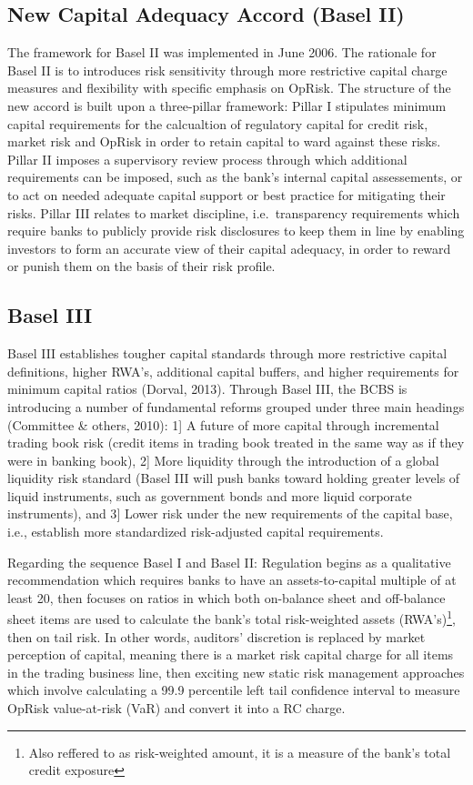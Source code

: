 \documentclass{DissertateUSU}
\begin{document}
\subsection{New Capital Adequacy Accord (Basel II)}

The framework for Basel II was implemented in June 2006. The rationale
for Basel II is to introduces risk sensitivity through more restrictive
capital charge measures and flexibility with specific emphasis on
OpRisk. The structure of the new accord is built upon a three-pillar
framework: Pillar I stipulates minimum capital requirements for the
calcualtion of regulatory capital for credit risk, market risk and
OpRisk in order to retain capital to ward against these risks. Pillar II
imposes a supervisory review process through which additional
requirements can be imposed, such as the bank's internal capital
assessements, or to act on needed adequate capital support or best
practice for mitigating their risks. Pillar III relates to market
discipline, i.e.~transparency requirements which require banks to
publicly provide risk disclosures to keep them in line by enabling
investors to form an accurate view of their capital adequacy, in order
to reward or punish them on the basis of their risk profile.\medskip

\subsection{Basel III}

Basel III establishes tougher capital standards through more restrictive
capital definitions, higher RWA's, additional capital buffers, and
higher requirements for minimum capital ratios (Dorval, 2013). Through
Basel III, the BCBS is introducing a number of fundamental reforms
grouped under three main headings (Committee \& others, 2010): 1{]} A
future of more capital through incremental trading book risk (credit
items in trading book treated in the same way as if they were in banking
book), 2{]} More liquidity through the introduction of a global
liquidity risk standard (Basel III will push banks toward holding
greater levels of liquid instruments, such as government bonds and more
liquid corporate instruments), and 3{]} Lower risk under the new
requirements of the capital base, i.e., establish more standardized
risk-adjusted capital requirements.\medskip

Regarding the sequence Basel I and Basel II: Regulation begins as a
qualitative recommendation which requires banks to have an
assets-to-capital multiple of at least 20, then focuses on ratios in
which both on-balance sheet and off-balance sheet items are used to
calculate the bank's total risk-weighted assets
(RWA's)\footnote{Also reffered to as risk-weighted amount, it is a measure of the bank's total credit exposure},
then on tail risk. In other words, auditors' discretion is replaced by
market perception of capital, meaning there is a market risk capital
charge for all items in the trading business line, then exciting new
static risk management approaches which involve calculating a 99.9
percentile left tail confidence interval to measure OpRisk value-at-risk
(VaR) and convert it into a RC charge.\medskip 
\end{document}
